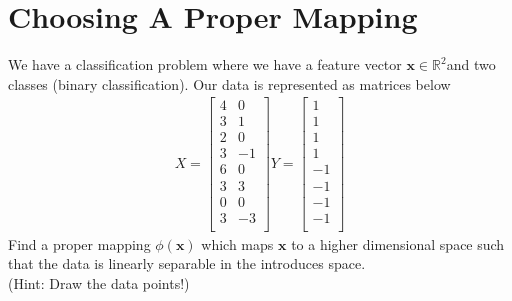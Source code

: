 \documentclass[12pt]{article}
\begin{document}
\section{Choosing A Proper Mapping}
We have a classification problem where we have a feature vector $\mathbf{x} \in \mathbb{R}^{2}$and two classes (binary classification). Our data is represented as matrices below
\begin{gather*}
    X = \begin{bmatrix}
        4 & 0  \\
        3 & 1  \\
        2 & 0  \\
        3 & -1 \\
        6 & 0  \\
        3 & 3  \\
        0 & 0  \\
        3 & -3 \\
    \end{bmatrix}
    Y = \begin{bmatrix}
        1  \\
        1  \\
        1  \\
        1  \\
        -1 \\
        -1 \\
        -1 \\
        -1 \\
    \end{bmatrix}
\end{gather*}
Find a proper mapping $\phi(\mathbf{x})$ which maps $\mathbf{x}$ to a higher dimensional space such that the data is linearly separable in the introduces space.\\
(Hint: Draw the data points!)
\end{document}
